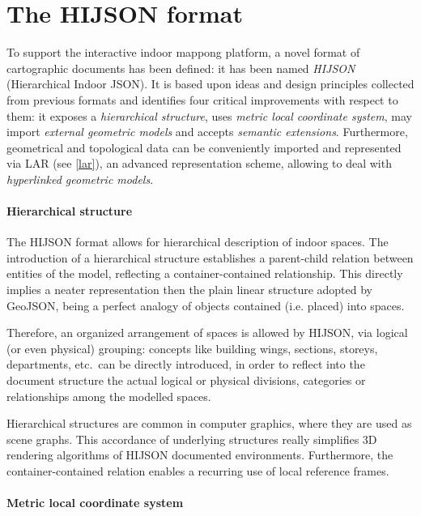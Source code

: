 \section{The HIJSON format}\label{hijson}

To support the interactive indoor mappong platform, a novel format of
cartographic documents has been defined: it has been named \emph{HIJSON}
(Hierarchical Indoor JSON). It is based upon ideas and design principles
collected from previous formats and identifies four critical improvements with
respect to them: it exposes a \emph{hierarchical structure}, uses \emph{metric
local coordinate system}, may import \emph{external geometric models} and
accepts \emph{semantic extensions}. Furthermore, geometrical  and topological
data can be conveniently imported and represented via LAR (see \ref{lar}), an
advanced representation scheme, allowing to deal with \emph{hyperlinked
geometric models}.



\paragraph*{Hierarchical structure}\label{hierarchical-structure}

The HIJSON format allows for hierarchical description of indoor spaces. The
introduction of a hierarchical structure establishes a parent-child relation
between entities of the model, reflecting a container-contained relationship.
This directly implies a neater representation then the plain linear structure
adopted by GeoJSON, being a perfect analogy of objects contained (i.e.
placed) into spaces.

Therefore, an organized arrangement of spaces is allowed by HIJSON, via
logical (or even physical) grouping: concepts like building wings, sections,
storeys, departments, etc.~can be directly introduced, in order to reflect
into the document structure the actual logical or physical divisions,
categories or relationships among the modelled spaces.

Hierarchical structures are common in computer graphics, where they are used
as scene graphs. This accordance of underlying structures really simplifies 3D
rendering algorithms of HIJSON documented environments. Furthermore, the
container-contained relation enables a recurring use of local reference
frames.

\paragraph*{Metric local coordinate system}\label{metric-local-coordinate-system}

